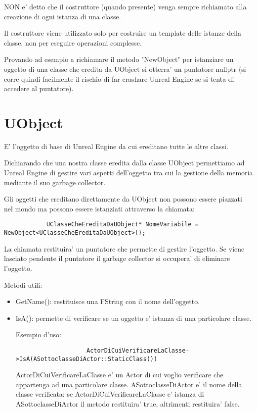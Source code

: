        \begin{warningbox}
            NON e' detto che il costruttore (quando presente) venga sempre richiamato alla creazione di ogni istanza di una classe.

            Il costruttore viene utilizzato solo per costruire un template delle istanze della classe, non per eseguire operazioni complesse.

            Provando ad esempio a richiamare il metodo "NewObject" per istanziare un oggetto di una classe che eredita da UObject
            si otterra' un puntatore nullptr (si corre quindi facilmente il rischio di far crashare Unreal Engine se si tenta di accedere al puntatore).
        \end{warningbox}


    \section{UObject}
        E' l'oggetto di base di Unreal Engine da cui ereditano tutte le altre classi.

        Dichiarando che una nostra classe eredita dalla classe UObject permettiamo ad Unreal Engine di gestire vari aspetti dell'oggetto tra cui la gestione della memoria mediante il suo garbage collector.

        Gli oggetti che ereditano direttamente da UObject non possono essere piazzati nel mondo ma possono essere istanziati attraverso la chiamata:

        \begin{verbatim}
            UClasseCheEreditaDaUObject* NomeVariabile = NewObject<UClasseCheEreditaDaUObject>();
        \end{verbatim}

        La chiamata restituira' un puntatore che permette di gestire l'oggetto. Se viene lasciato pendente il puntatore il garbage collector si occupera' di eliminare l'oggetto.

        Metodi utili:
        \begin{itemize}
            \item GetName(): restituisce una FString con il nome dell'oggetto.
            \item IsA(): permette di verificare se un oggetto e' istanza di una particolare classe.

                Esempio d'uso:
                \begin{verbatim}
                    ActorDiCuiVerificareLaClasse->IsA(ASottoclasseDiActor::StaticClass())
                \end{verbatim}

                ActorDiCuiVerificareLaClasse e' un Actor di cui voglio verificare che appartenga ad una particolare classe.
                ASottoclasseDiActor e' il nome della classe verificata: se ActorDiCuiVerificareLaClasse e' istanza di ASottoclasseDiActor
                il metodo restituira' true, altrimenti restituira' false.

        \end{itemize}



